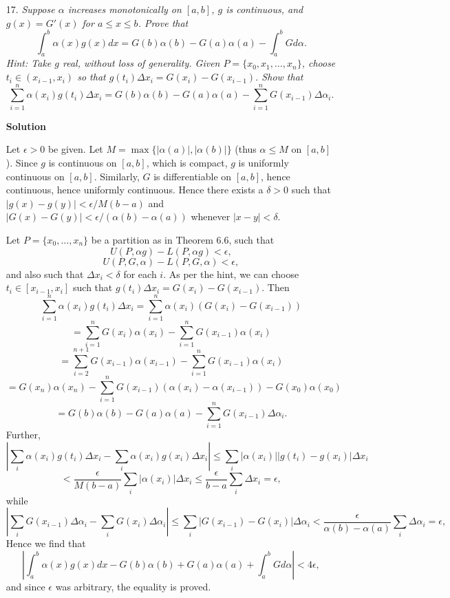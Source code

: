 \documentclass{article}
\begin{document}
\begin{enumerate}
\begin{itemize}
\item[17.] {\em Suppose \(\alpha\) increases monotonically on \([a,b]\), \(g\) is continuous, and \(g(x) = G'(x)\) for \(a \leq x \leq b\).  Prove that
\[\int_a^b \alpha(x) g(x) dx = G(b) \alpha(b) - G(a) \alpha(a) - \int_a^b G d\alpha.\]
{\em Hint:}  Take \(g\) real, without loss of generality.  Given \(P = \{x_0, x_1, \ldots, x_n\}\), choose \(t_i \in (x_{i - 1}, x_i)\) so that \(g(t_i) \Delta x_i = G(x_i) - G(x_{i - 1})\).  Show that
\[\sum_{i = 1}^n \alpha(x_i) g(t_i) \Delta x_i = G(b) \alpha(b) - G(a) \alpha(a) - \sum_{i = 1}^n G(x_{i - 1}) \Delta \alpha_i.\]}

{\bf Solution}

Let \(\epsilon > 0\) be given.  Let \(M = \max \{|\alpha(a)|, |\alpha(b)|\}\) (thus \(\alpha \leq M\) on \([a,b]\)).  Since \(g\) is continuous on \([a,b]\), which is compact, \(g\) is uniformly continuous on \([a,b]\).  Similarly, \(G\) is differentiable on \([a,b]\), hence continuous, hence uniformly continuous.  Hence there exists a \(\delta > 0\) such that \(|g(x) - g(y)| < \epsilon / M(b - a)\) and \(|G(x) - G(y)| < \epsilon / (\alpha(b) - \alpha(a))\) whenever \(|x - y| < \delta\).

Let \(P = \{x_0, \ldots, x_n\}\) be a partition as in Theorem 6.6, such that
\[U(P, \alpha g) - L(P, \alpha g) < \epsilon,\]
\[U(P, G, \alpha) - L(P, G, \alpha) < \epsilon,\]
and also such that \(\Delta x_i < \delta\) for each \(i\).  As per the hint, we can choose \(t_i \in [x_{i - 1}, x_i]\) such that \(g(t_i) \Delta x_i = G(x_i) - G(x_{i - 1})\).  Then
\[\sum_{i = 1}^n \alpha(x_i) g(t_i) \Delta x_i
   = \sum_{i = 1}^n \alpha(x_i) \left( G(x_i) - G(x_{i - 1}) \right)\]
\[ = \sum_{i = 1}^n G(x_i) \alpha(x_i) - \sum_{i = 1}^n G(x_{i - 1}) \alpha(x_i)\]
\[ = \sum_{i = 2}^{n + 1} G(x_{i - 1}) \alpha(x_{i - 1}) - \sum_{i = 1}^n G(x_{i - 1}) \alpha(x_i)\]
\[ = G(x_n) \alpha(x_n) - \sum_{i = 1}^n G(x_{i - 1}) \left( \alpha(x_i) - \alpha(x_{i - 1}) \right) - G(x_0) \alpha(x_0)\]
\[ = G(b) \alpha(b) - G(a) \alpha(a) - \sum_{i = 1}^n G(x_{i - 1}) \Delta\alpha_i.\]
Further,
\[\left| \sum_i \alpha(x_i) g(t_i) \Delta x_i - \sum_i \alpha(x_i) g(x_i) \Delta x_i \right|
 \leq \sum_i \left| \alpha(x_i) \right| \left| g(t_i) - g(x_i) \right| \Delta x_i\]
\[  < \frac{\epsilon}{M(b - a)} \sum_i \left| \alpha(x_i) \right| \Delta x_i
 \leq \frac{\epsilon}{b - a} \sum_i \Delta x_i
    = \epsilon,\]
while
\[\left| \sum_i G(x_{i - 1}) \Delta\alpha_i - \sum_i G(x_i) \Delta\alpha_i \right|
 \leq \sum_i \left| G(x_{i - 1}) - G(x_i) \right| \Delta\alpha_i
    < \frac{\epsilon}{\alpha(b) - \alpha(a)} \sum_i \Delta\alpha_i
    = \epsilon,\]
Hence we find that
\[\left| \int_a^b \alpha(x) g(x) dx - G(b) \alpha(b) + G(a) \alpha(a) + \int_a^b G d\alpha \right| < 4 \epsilon,\]
and since \(\epsilon\) was arbitrary, the equality is proved.




\end{itemize}
\end{enumerate}
\end{document}
